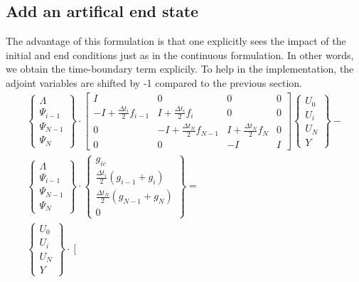 \documentclass[10pt]{article}
\begin{document}
\subsection*{Add an artifical end state}
The advantage of this formulation is that one explicitly sees the impact of
the initial and end conditions just as in the continuous formulation.  In
other words, we obtain the time-boundary term explicily.  To help in the
implementation, the adjoint variables are shifted by -1 compared to the
previous section.
\begin{eqnarray}
\left\{\begin{array}{c} 
\Lambda \\ \Psi_{i-1} \\\Psi_{N-1} \\ \Psi_N 
\end{array}\right\}
\cdot
\left[ \begin{array}{cccc} 
I & 0 & 0 & 0 \\
-I + \frac{\Delta t_i}{2} f_{i-1} & I + \frac{\Delta t_i}{2} f_i & 0 & 0 \\
0 & -I + \frac{\Delta t_N}{2} f_{N-1} & I + \frac{\Delta t_N}{2} f_N & 0 \\
0 & 0 & -I & I  
\end{array} \right] 
\left\{\begin{array}{c} U_0 \\ U_i \\ U_N \\ Y \end{array} \right\} - 
\nonumber\\
\left\{\begin{array}{c} 
\Lambda \\ \Psi_{i-1} \\ \Psi_{N-1} \\ \Psi_N \end{array}\right\}
\cdot
\left\{\begin{array}{c} g_{ic} \\ \frac{\Delta t_i}{2}(g_{i-1} + g_i) \\ 
\frac{\Delta t_N}{2}(g_{N-1} + g_N) \\ 0 \end{array} \right\} = \\
\left\{\begin{array}{c} U_0 \\ U_i \\ U_N \\ Y \end{array}\right\}
\cdot
\left[ \begin{array}{cccc} 

\end{array}
\end{eqnarray}
\end{document}
